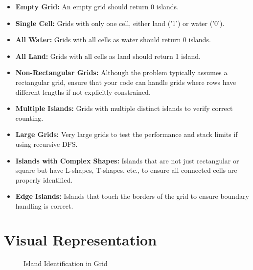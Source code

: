 \begin{itemize}
    \item \textbf{Empty Grid:} An empty grid should return 0 islands.
    
    \item \textbf{Single Cell:} Grids with only one cell, either land ('1') or water ('0').
    
    \item \textbf{All Water:} Grids with all cells as water should return 0 islands.
    
    \item \textbf{All Land:} Grids with all cells as land should return 1 island.
    
    \item \textbf{Non-Rectangular Grids:} Although the problem typically assumes a rectangular grid, ensure that your code can handle grids where rows have different lengths if not explicitly constrained.
    
    \item \textbf{Multiple Islands:} Grids with multiple distinct islands to verify correct counting.
    
    \item \textbf{Large Grids:} Very large grids to test the performance and stack limits if using recursive DFS.
    
    \item \textbf{Islands with Complex Shapes:} Islands that are not just rectangular or square but have L-shapes, T-shapes, etc., to ensure all connected cells are properly identified.
    
    \item \textbf{Edge Islands:} Islands that touch the borders of the grid to ensure boundary handling is correct.
\end{itemize}
    
\section*{Visual Representation}
\begin{figure}[h]
    \centering
    \caption{Island Identification in Grid}
    \label{fig:island_visualization}
\end{figure}

